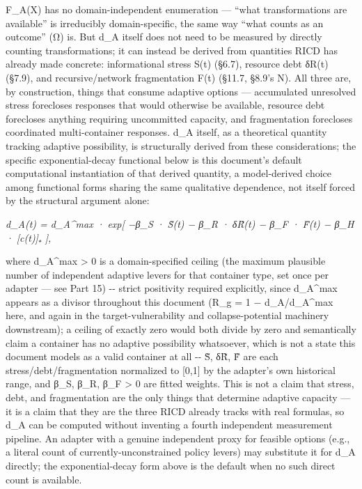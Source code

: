 \documentclass[
]{article}
\begin{document}
F\_A(X) has no domain-independent enumeration --- ``what transformations
are available'' is irreducibly domain-specific, the same way ``what
counts as an outcome'' (Ω) is. But d\_A itself does not need to be
measured by directly counting transformations; it can instead be derived
from quantities RICD has already made concrete: informational stress
S(t) (§6.7), resource debt δR(t) (§7.9), and recursive/network
fragmentation F(t) (§11.7, §8.9's N). All three are, by construction,
things that consume adaptive options --- accumulated unresolved stress
forecloses responses that would otherwise be available, resource debt
forecloses anything requiring uncommitted capacity, and fragmentation
forecloses coordinated multi-container responses. d\_A itself, as a
theoretical quantity tracking adaptive possibility, is structurally
derived from these considerations; the specific exponential-decay
functional below is this document's default computational instantiation
of that derived quantity, a model-derived choice among functional forms
sharing the same qualitative dependence, not itself forced by the
structural argument alone:

\emph{d\_A(t) = d\_A\^{}max · exp{[} −β\_S · S̃(t) − β\_R · δR̃(t) − β\_F
· F̃(t) − β\_H · {[}c(t){]}₊ {]},}

where d\_A\^{}max \textgreater{} 0 is a domain-specified ceiling (the
maximum plausible number of independent adaptive levers for that
container type, set once per adapter --- see Part 15) -\/- strict
positivity required explicitly, since d\_A\^{}max appears as a divisor
throughout this document (R\_g = 1 − d\_A/d\_A\^{}max here, and again in
the target-vulnerability and collapse-potential machinery downstream); a
ceiling of exactly zero would both divide by zero and semantically claim
a container has no adaptive possibility whatsoever, which is not a state
this document models as a valid container at all -\/- S̃, δR̃, F̃ are each
stress/debt/fragmentation normalized to {[}0,1{]} by the adapter's own
historical range, and β\_S, β\_R, β\_F \textgreater{} 0 are fitted
weights. This is not a claim that stress, debt, and fragmentation are
the only things that determine adaptive capacity --- it is a claim that
they are the three RICD already tracks with real formulas, so d\_A can
be computed without inventing a fourth independent measurement pipeline.
An adapter with a genuine independent proxy for feasible options (e.g.,
a literal count of currently-unconstrained policy levers) may substitute
it for d\_A directly; the exponential-decay form above is the default
when no such direct count is available.
\end{document}
